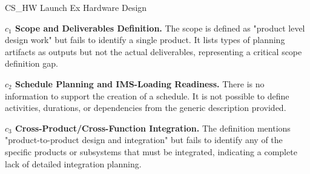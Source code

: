 %
\begin{frame}{CS\_HW Launch Ex Hardware Design}
\begin{minipage}{0.90\textwidth}
\raggedright
\fontsize{8}{9.5}\selectfont
\textbf{\(c_1\) Scope and Deliverables Definition.}
The scope is defined as "product level design work" but fails to identify a single product. It lists types of planning artifacts as outputs but not the actual deliverables, representing a critical scope definition gap.\par\vspace{0.6em}
\textbf{\(c_2\) Schedule Planning and IMS-Loading Readiness.}
There is no information to support the creation of a schedule. It is not possible to define activities, durations, or dependencies from the generic description provided.\par\vspace{0.6em}
\textbf{\(c_3\) Cross-Product/Cross-Function Integration.}
The definition mentions "product-to-product design and integration" but fails to identify any of the specific products or subsystems that must be integrated, indicating a complete lack of detailed integration planning.\par\vspace{0.6em}
\end{minipage}
\end{frame}

\endinput
